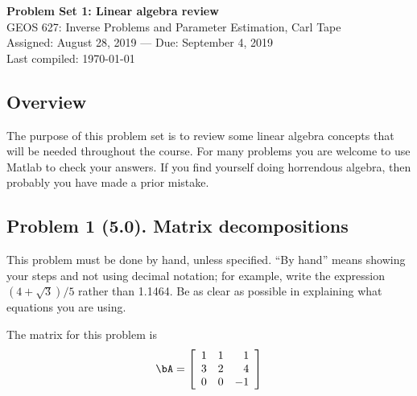 \documentclass[11pt,titlepage,fleqn]{article}
\begin{document}

\begin{spacing}{1.2}
\centering
{\large \bf Problem Set 1: Linear algebra review} \\
GEOS 627: Inverse Problems and Parameter Estimation, Carl Tape \\
Assigned: August 28, 2019 --- Due: September 4, 2019 \\
Last compiled: \today
\end{spacing}


\subsection*{Overview}

The purpose of this problem set is to review some linear algebra concepts that will be needed throughout the course. For many problems you are welcome to use Matlab to check your answers. If you find yourself doing horrendous algebra, then probably you have made a prior mistake.


\subsection*{Problem 1 (5.0). Matrix decompositions}

This problem must be done by hand, unless specified. ``By hand'' means showing your steps and not using decimal notation; for example, write the expression $(4 +\sqrt{3})/5$ rather than 1.1464.
Be as clear as possible in explaining what equations you are using.

\medskip\noindent
The matrix for this problem is
%
\begin{equation*}
\bA =  \left[ \begin{array}{rrr}
     1  &   1  &   1 \\
     3  &   2  &   4 \\
     0  &   0  &  -1 \\
\end{array} \right]
\end{equation*}



\end{document}
